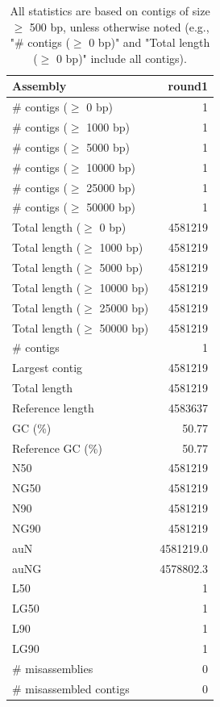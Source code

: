 \documentclass[12pt,a4paper]{article}
\begin{document}
\begin{table}[ht]
\begin{center}
\caption{All statistics are based on contigs of size $\geq$ 500 bp, unless otherwise noted (e.g., "\# contigs ($\geq$ 0 bp)" and "Total length ($\geq$ 0 bp)" include all contigs).}
\begin{tabular}{|l*{1}{|r}|}
\hline
Assembly & round1 \\ \hline
\# contigs ($\geq$ 0 bp) & 1 \\ \hline
\# contigs ($\geq$ 1000 bp) & 1 \\ \hline
\# contigs ($\geq$ 5000 bp) & 1 \\ \hline
\# contigs ($\geq$ 10000 bp) & 1 \\ \hline
\# contigs ($\geq$ 25000 bp) & 1 \\ \hline
\# contigs ($\geq$ 50000 bp) & 1 \\ \hline
Total length ($\geq$ 0 bp) & 4581219 \\ \hline
Total length ($\geq$ 1000 bp) & 4581219 \\ \hline
Total length ($\geq$ 5000 bp) & 4581219 \\ \hline
Total length ($\geq$ 10000 bp) & 4581219 \\ \hline
Total length ($\geq$ 25000 bp) & 4581219 \\ \hline
Total length ($\geq$ 50000 bp) & 4581219 \\ \hline
\# contigs & 1 \\ \hline
Largest contig & 4581219 \\ \hline
Total length & 4581219 \\ \hline
Reference length & 4583637 \\ \hline
GC (\%) & 50.77 \\ \hline
Reference GC (\%) & 50.77 \\ \hline
N50 & 4581219 \\ \hline
NG50 & 4581219 \\ \hline
N90 & 4581219 \\ \hline
NG90 & 4581219 \\ \hline
auN & 4581219.0 \\ \hline
auNG & 4578802.3 \\ \hline
L50 & 1 \\ \hline
LG50 & 1 \\ \hline
L90 & 1 \\ \hline
LG90 & 1 \\ \hline
\# misassemblies & 0 \\ \hline
\# misassembled contigs & 0 \\ \hline

\end{tabular}
\end{center}
\end{table}
\end{document}

